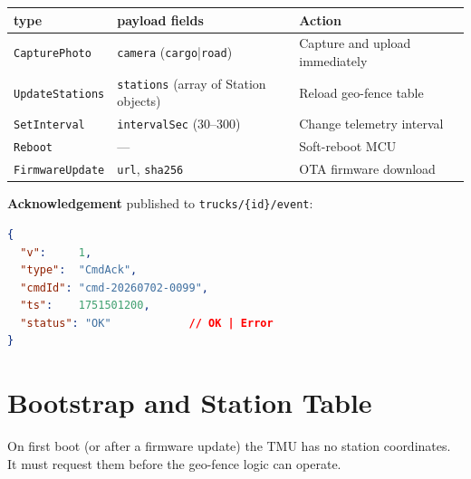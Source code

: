 \documentclass{article}
\begin{document}
\begin{center}
\begin{tabular}{lll}
\toprule
\textbf{type} & \textbf{payload fields} & \textbf{Action}\\
\midrule
\texttt{CapturePhoto}   & \texttt{camera} (\texttt{cargo}|\texttt{road}) & Capture and upload immediately\\
\texttt{UpdateStations} & \texttt{stations} (array of Station objects)   & Reload geo-fence table\\
\texttt{SetInterval}    & \texttt{intervalSec} (30--300)                 & Change telemetry interval\\
\texttt{Reboot}         & ---                                            & Soft-reboot MCU\\
\texttt{FirmwareUpdate} & \texttt{url}, \texttt{sha256}                  & OTA firmware download\\
\bottomrule
\end{tabular}
\end{center}

\textbf{Acknowledgement} published to \texttt{trucks/\{id\}/event}:

\begin{lstlisting}[language=json, caption=Command acknowledgement]
{
  "v":     1,
  "type":  "CmdAck",
  "cmdId": "cmd-20260702-0099",
  "ts":    1751501200,
  "status": "OK"            // OK | Error
}
\end{lstlisting}

\section{Bootstrap and Station Table}
\label{sec:bootstrap}

On first boot (or after a firmware update) the TMU has no station coordinates.
It must request them before the geo-fence logic can operate.
\end{document}
